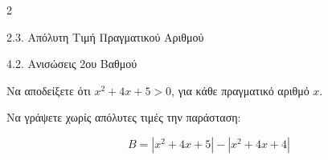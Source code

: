 \begin{ylh}{2}
    \item 2.3. Απόλυτη Τιμή Πραγματικού Αριθμού
    \item 4.2. Ανισώσεις 2ου Βαθμού
\end{ylh}

\begin{alist}
\item Να αποδείξετε ότι $x^{2} + 4x + 5 > 0$, για κάθε πραγματικό αριθμό $x$.
\item Να γράψετε χωρίς απόλυτες τιμές την παράσταση:

\begin{equation*}B = \left| x^{2} + 4x + 5 \right| - \left| x^{2} + 4x + 4 \right|\end{equation*}
\end{alist}

